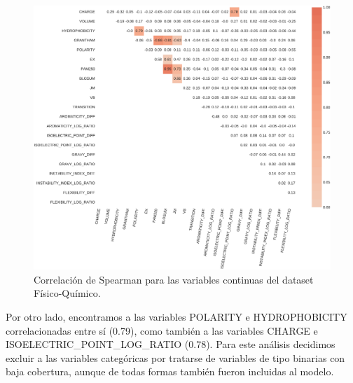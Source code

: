 \begin{figure}[H]
    \centering
    \includegraphics[scale=0.242]{documents/latex/figures/3/structural/structural_corr.pdf}
    \caption{Correlación de Spearman para las variables continuas del dataset Físico-Químico.}
    \label{fig:corrplot_structural}
\end{figure}





Por otro lado, encontramos a las variables POLARITY e HYDROPHOBICITY correlacionadas entre sí (0.79), como también a las variables CHARGE e ISOELECTRIC\_POINT\_LOG\_RATIO (0.78). Para este análisis decidimos excluir a las variables categóricas por tratarse de variables de tipo binarias con baja cobertura, aunque de todas formas también fueron incluidas al modelo.  





